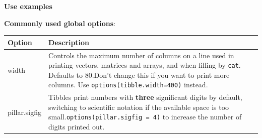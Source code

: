 \documentclass[
  a4paper,
  twoside,
  openright]{book}
\newenvironment{Shaded}{\begin{snugshade}}{\end{snugshade}}
\newcommand{\AttributeTok}[1]{\textcolor[rgb]{0.13,0.29,0.53}{#1}}
\newcommand{\CommentTok}[1]{\textcolor[rgb]{0.56,0.35,0.01}{\textit{#1}}}
\newcommand{\DecValTok}[1]{\textcolor[rgb]{0.00,0.00,0.81}{#1}}
\newcommand{\DocumentationTok}[1]{\textcolor[rgb]{0.56,0.35,0.01}{\textbf{\textit{#1}}}}
\newcommand{\FunctionTok}[1]{\textcolor[rgb]{0.13,0.29,0.53}{\textbf{#1}}}
\newcommand{\NormalTok}[1]{#1}
\newcommand{\SpecialCharTok}[1]{\textcolor[rgb]{0.81,0.36,0.00}{\textbf{#1}}}
\newcommand{\StringTok}[1]{\textcolor[rgb]{0.31,0.60,0.02}{#1}}
\theoremstyle{definition}
\theoremstyle{definition}
\theoremstyle{definition}
\theoremstyle{definition}
\theoremstyle{remark}
\begin{document}
\textbf{Use examples}

\begin{Shaded}
\end{Shaded}

\textbf{Commonly used global options}:

\begin{longtable}[]{@{}
  >{\raggedright\arraybackslash}p{}
  >{\raggedright\arraybackslash}p{}@{}}
\toprule\noalign{}
\begin{minipage}[b]{\linewidth}\raggedright
Option
\end{minipage} & \begin{minipage}[b]{\linewidth}\raggedright
Description
\end{minipage} \\
\midrule\noalign{}
\endhead
\bottomrule\noalign{}
\endlastfoot
width & Controls the maximum number of columns on a line used in printing vectors, matrices and arrays, and when filling by \texttt{cat}. Defaults to 80.Don't change this if you want to print more columns. Use {\texttt{options(tibble.width=400)}} instead. \\
pillar.sigfig & Tibbles print numbers with {\textbf{three} significant digits} by default, switching to scientific notation if the available space is too small.\texttt{options(pillar.sigfig\ =\ 4)} to increase the number of digits printed out. \\
\end{longtable}
\end{document}
